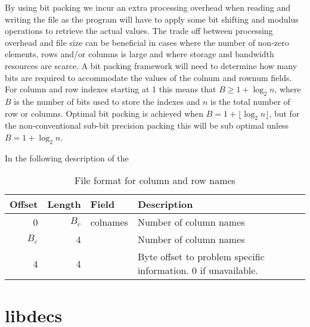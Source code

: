 By using bit packing we incur an extra processing overhead when reading and writing the file as the program will have to apply some bit shifting and modulus operations to retrieve the actual values.
The trade off between processing overhead and file size can be beneficial in cases where the number of non-zero elements, rows and/or columns is large and where storage and bandwidth resources are scarce.
A bit packing framework will need to determine how many bits are required to accommodate the values of the colnum and rownum fields.
For column and row indexes starting at 1 this means that $B \geq 1 + \log_2{n}$, where $B$ is the number of bits used to store the indexes and $n$ is the total number of row or columns.
Optimal bit packing is achieved when $B = 1 + \lfloor \log_2{n} \rfloor$, but for the non-conventional sub-bit precision packing this will be sub optimal unless $B = 1 + \log_2{n}$.

In the following description of the 


\begin{table}[htbp]
	\centering
	\begin{tabular}{|r|r|l|p{2.7in}|}
		\hline
		\bf Offset & \bf Length & \bf Field & \bf Description \\ \hline
		0     & $B_c$ & colnames & Number of column names \\ \hline
		$B_c$ & 4     &  & Number of column names \\ \hline
		4     & 4     &   & Byte offset to problem specific information. 0 if unavailable. \\ \hline
	\end{tabular}
	\caption{File format for column and row names}
	\label{tab:colrowformat}
\end{table}





\section{libdecs}




